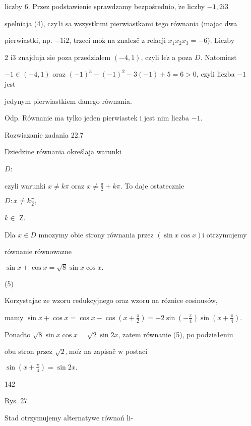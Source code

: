 \documentclass[a4paper,12pt]{article}
\begin{document}
liczby 6. Przez podstawienie sprawdzamy bezpośrednio, $\dot{\mathrm{z}}\mathrm{e}$ liczby $-1, 2\mathrm{i}3$

spelniaja (4), czy1i sa wszystkimi pierwiastkami tego równania (majac dwa

pierwiastki, np. $-1\mathrm{i}2$, trzeci $\mathrm{m}\mathrm{o}\dot{\mathrm{z}}$ na znalez$\acute{}$č $\mathrm{z}$ relacji $x_{1}x_{2}x_{3}=-6$). Liczby

2 $\mathrm{i}3$ znajduja $\mathrm{s}\mathrm{i}\mathrm{e}$ poza przedzialem $(-4,1)$, czyli $\mathrm{l}\mathrm{e}\dot{\mathrm{z}}$ a poza $D$. Natomiast

$-1\in(-4,1)$ oraz $(-1)^{3}-(-1)^{2}-3(-1)+5=6>0$, czyli liczba $-1$ jest

jedynym pierwiastkiem danego równania.

Odp. Równanie ma tylko jeden pierwiastek $\mathrm{i}$ jest nim liczba $-1.$

Rozwiazanie zadania 22.7

Dziedzine równania określaja warunki

$D$: 

czyli warunki $ x\neq k\pi$ oraz $ x\displaystyle \neq\frac{\pi}{2}+k\pi$. To daje ostatecznie

$D:x\displaystyle \neq k\frac{\pi}{2},$

$ k\in$ Z.

Dla $x\in D$ mnozymy obie strony równania przez $(\sin x\cos x)\mathrm{i}$ otrzymujemy

równanie równowazne

$\sin x+\cos x=\sqrt{8}\sin x\cos x.$

(5)

Korzystajac ze wzoru redukcyjnego oraz wzoru na róznice cosinusów,

mamy $\sin x+\cos x = \displaystyle \cos x-\cos(x+\frac{\pi}{2}) = -2\displaystyle \sin(-\frac{\pi}{4})\sin(x+\frac{\pi}{4}).$

Ponadto $\sqrt{8}\sin x\cos x = \sqrt{2}\sin 2x$, zatem równanie (5), po podzie1eniu

obu stron przez $\sqrt{2}, \mathrm{m}\mathrm{o}\dot{\mathrm{z}}$ na zapisač $\mathrm{w}$ postaci

$\displaystyle \sin(x+\frac{\pi}{4})=\sin 2x.$





142

Rys. 27

Stad otrzymujemy alternatywe równań li-
\end{document}

